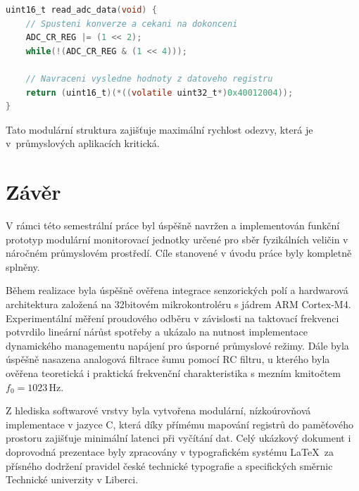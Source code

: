 \documentclass[FM,SP]{tulthesis}
\begin{document}
\begin{lstlisting}[language=C, caption={Funkce pro vyčítání dat z převodníku}, label={lst:read_data}, frame=single]
uint16_t read_adc_data(void) {
    // Spusteni konverze a cekani na dokonceni
    ADC_CR_REG |= (1 << 2); 
    while(!(ADC_CR_REG & (1 << 4)));
    
    // Navraceni vysledne hodnoty z datoveho registru
    return (uint16_t)(*((volatile uint32_t*)0x40012004));
}
\end{lstlisting}

Tato modulární struktura zajišťuje maximální rychlost odezvy, která je v~průmyslových aplikacích kritická.

\chapter*{Závěr}

V rámci této semestrální práce byl úspěšně navržen a implementován funkční prototyp modulární monitorovací jednotky určené pro sběr fyzikálních veličin v náročném průmyslovém prostředí. Cíle stanovené v úvodu práce byly kompletně splněny.

Během realizace byla úspěšně ověřena integrace senzorických polí a hardwarová architektura založená na 32bitovém mikrokontroléru s jádrem ARM Cortex-M4. Experimentální měření proudového odběru v závislosti na taktovací frekvenci potvrdilo lineární nárůst spotřeby a ukázalo na nutnost implementace dynamického managementu napájení pro úsporné průmyslové režimy. Dále byla úspěšně nasazena analogová filtrace šumu pomocí RC filtru, u kterého byla ověřena teoretická i praktická frekvenční charakteristika s mezním kmitočtem $f_0 = 1023\,\mathrm{Hz}$.

Z hlediska softwarové vrstvy byla vytvořena modulární, nízkoúrovňová implementace v jazyce C, která díky přímému mapování registrů do paměťového prostoru zajišťuje minimální latenci při vyčítání dat. Celý ukázkový dokument i doprovodná prezentace byly zpracovány v typografickém systému \LaTeX\ za přísného dodržení pravidel české technické typografie a specifických směrnic Technické univerzity v Liberci.

\printbibliography[title={Použitá literatura},heading=bibintoc] %
\end{document}
